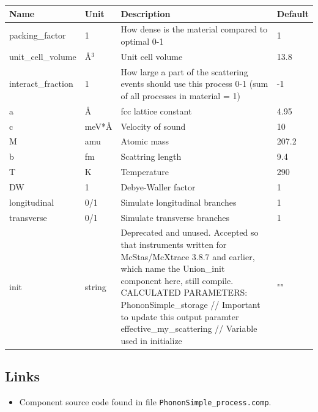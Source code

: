 \begin{longtable}{p{}p{}p{}p{}}
\toprule
\textbf{Name} & \textbf{Unit} & \textbf{Description} & \textbf{Default} \\
\midrule
\endhead
packing\_factor & 1 & How dense is the material compared to optimal 0-1 & 1 \\
unit\_cell\_volume & \AA{}$^{3}$ & Unit cell volume & 13.8 \\
interact\_fraction & 1 & How large a part of the scattering events should use this process 0-1 (sum of all processes in material = 1) & -1 \\
a & \AA{} & fcc lattice constant & 4.95 \\
c & meV*\AA{} & Velocity of sound & 10 \\
M & amu & Atomic mass & 207.2 \\
b & fm & Scattring length & 9.4 \\
T & K & Temperature & 290 \\
DW & 1 & Debye-Waller factor & 1 \\
longitudinal & 0/1 & Simulate longitudinal branches & 1 \\
transverse & 0/1 & Simulate transverse branches & 1 \\
init & string & Deprecated and unused. Accepted so that instruments written for McStas/McXtrace 3.8.7 and earlier, which name the Union\_init component here, still compile. CALCULATED PARAMETERS: PhononSimple\_storage      // Important to update this output paramter effective\_my\_scattering   // Variable used in initialize & "" \\
\bottomrule
\end{longtable}

\subsection*{Links}
\begin{itemize}
  \item Component source code found in file \texttt{PhononSimple\_process.comp}.
\end{itemize}
